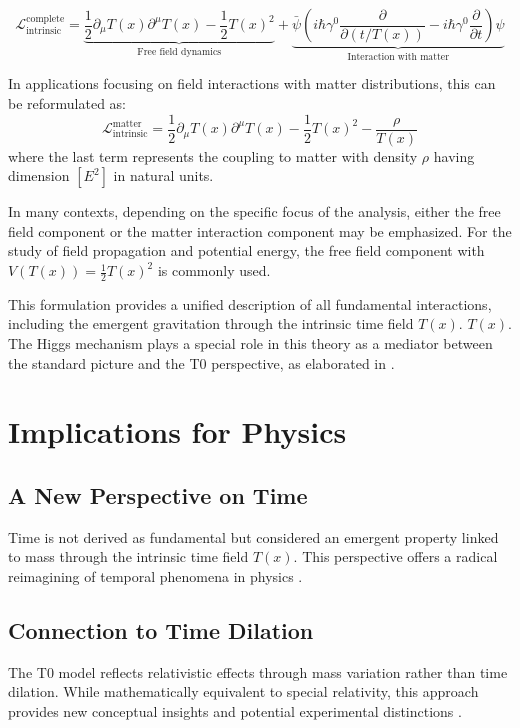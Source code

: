 \documentclass[12pt,a4paper]{article}
\newcommand{\Tfield}{T(x)}
\begin{document}
\begin{equation}
	\mathcal{L}_{\text{intrinsic}}^{\text{complete}} = \underbrace{\frac{1}{2} \partial_\mu \Tfield \partial^\mu \Tfield - \frac{1}{2}\Tfield^2}_{\text{Free field dynamics}} + \underbrace{\bar{\psi} \left( i\hbar \gamma^0 \frac{\partial}{\partial (t/\Tfield)} - i\hbar \gamma^0 \frac{\partial}{\partial t} \right) \psi}_{\text{Interaction with matter}}
\end{equation}

In applications focusing on field interactions with matter distributions, this can be reformulated as:
\begin{equation}
	\mathcal{L}_{\text{intrinsic}}^{\text{matter}} = \frac{1}{2} \partial_\mu \Tfield \partial^\mu \Tfield - \frac{1}{2}\Tfield^2 - \frac{\rho}{\Tfield}
\end{equation}
where the last term represents the coupling to matter with density $\rho$ having dimension $[E^2]$ in natural units.

In many contexts, depending on the specific focus of the analysis, either the free field component or the matter interaction component may be emphasized. For the study of field propagation and potential energy, the free field component with $V(\Tfield) = \frac{1}{2}\Tfield^2$ is commonly used.

This formulation provides a unified description of all fundamental interactions, including the emergent gravitation through the intrinsic time field \(\Tfield\). \(\Tfield\). The Higgs mechanism plays a special role in this theory as a mediator between the standard picture and the T0 perspective, as elaborated in \cite{pascher_higgs_2025}.
\section{Implications for Physics}
	\subsection{A New Perspective on Time}
	Time is not derived as fundamental but considered an emergent property linked to mass through the intrinsic time field \(\Tfield\). This perspective offers a radical reimagining of temporal phenomena in physics \cite{pascher_zeit_masse_2025}.
	
	\subsection{Connection to Time Dilation}
	The T0 model reflects relativistic effects through mass variation rather than time dilation. While mathematically equivalent to special relativity, this approach provides new conceptual insights and potential experimental distinctions \cite{pascher_messdifferenzen_2025}.
	
\end{document}
